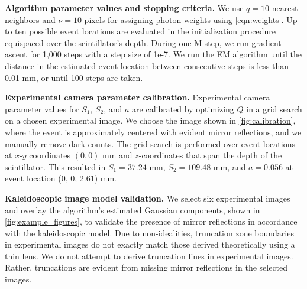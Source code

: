 \noindent
\textbf{Algorithm parameter values and stopping criteria.}
We use $q=10$ nearest neighbors and $\nu=10$ pixels for assigning photon weights 
using \cref{eqn:weights}.
Up to ten possible event locations are evaluated in the initialization procedure 
equispaced over the scintillator's depth.
During one M-step, we run gradient ascent for 1,000 steps with a step size of 1e-7.
We run the EM algorithm until the distance in the estimated event location between 
consecutive steps is less than 0.01 mm, or until 100 steps are taken.

\noindent
\textbf{Experimental camera parameter calibration.}
Experimental camera parameter values for $S_1$, $S_2$, and $a$ are calibrated by 
optimizing $Q$ in a grid search on a chosen experimental image.
We choose the image shown in \cref{fig:calibration}, where the event is 
approximately centered with evident mirror reflections, and we manually remove 
dark counts.
The grid search is performed over event locations at $x$-$y$ coordinates 
$(0,0)$ mm and $z$-coordinates that span the depth of the scintillator.
This resulted in $S_1=37.24$ mm, $S_2=109.48$ mm, and $a=0.056$ at event location 
(0, 0, 2.61) mm.


\noindent
\textbf{Kaleidoscopic image model validation.}
We select six experimental images and overlay the algorithm's estimated Gaussian 
components, shown in \cref{fig:example_figures}, to validate the presence of 
mirror reflections in accordance with the kaleidoscopic model.
Due to non-idealities, truncation zone boundaries in experimental images do not 
exactly match those derived theoretically using a thin lens.
We do not attempt to derive truncation lines in experimental images.
Rather, truncations are evident from missing mirror reflections in the selected images.

